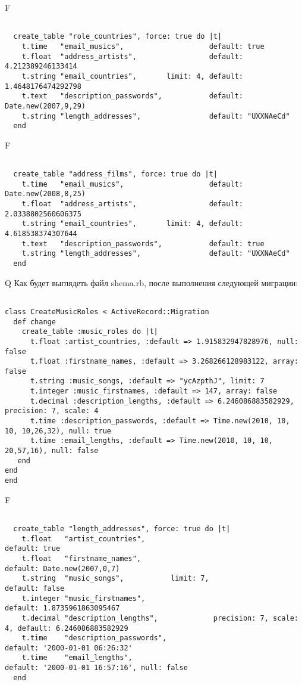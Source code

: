 F
\begin{verbatim}

  create_table "role_countries", force: true do |t|
    t.time   "email_musics",                    default: true
    t.float  "address_artists",                 default: 4.212389246133414
    t.string "email_countries",       limit: 4, default: 1.4648176474292798
    t.text   "description_passwords",           default: Date.new(2007,9,29)
    t.string "length_addresses",                default: "UXXNAeCd"
  end

\end{verbatim}

F
\begin{verbatim}

  create_table "address_films", force: true do |t|
    t.time   "email_musics",                    default: Date.new(2008,8,25)
    t.float  "address_artists",                 default: 2.0338802560606375
    t.string "email_countries",       limit: 4, default: 4.618538374307644
    t.text   "description_passwords",           default: true
    t.string "length_addresses",                default: "UXXNAeCd"
  end

\end{verbatim}

Q
Как будет выглядеть файл shema.rb, после выполнения следующей миграции:

\begin{verbatim}

class CreateMusicRoles < ActiveRecord::Migration 
  def change 
    create_table :music_roles do |t| 
      t.float :artist_countries, :default => 1.915832947828976, null: false
      t.float :firstname_names, :default => 3.268266128983122, array: false
      t.string :music_songs, :default => "ycAzpthJ", limit: 7
      t.integer :music_firstnames, :default => 147, array: false
      t.decimal :description_lengths, :default => 6.246086883582929, precision: 7, scale: 4
      t.time :description_passwords, :default => Time.new(2010, 10, 10, 10,26,32), null: true
      t.time :email_lengths, :default => Time.new(2010, 10, 10, 20,57,16), null: false
   end
end
end
\end{verbatim}

F
\begin{verbatim}

  create_table "length_addresses", force: true do |t|
    t.float   "artist_countries",                                        default: true
    t.float   "firstname_names",                                         default: Date.new(2007,0,7)
    t.string  "music_songs",           limit: 7,                         default: false
    t.integer "music_firstnames",                                        default: 1.8735961863095467
    t.decimal "description_lengths",             precision: 7, scale: 4, default: 6.246086883582929
    t.time    "description_passwords",                                   default: '2000-01-01 06:26:32'
    t.time    "email_lengths",                                           default: '2000-01-01 16:57:16', null: false
  end

\end{verbatim}

